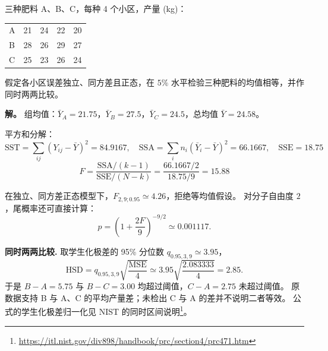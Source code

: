 \begin{exbox}[三种肥料产量比较]
三种肥料 A、B、C，每种 4 个小区，产量 (kg)：

\begin{center}
\begin{tabular}{lcccc}
\hline
A & 21 & 24 & 22 & 20 \\
B & 28 & 26 & 29 & 27 \\
C & 25 & 23 & 26 & 24 \\
\hline
\end{tabular}
\end{center}
假定各小区误差独立、同方差且正态，在 $5\%$ 水平检验三种肥料的均值相等，并作同时两两比较。

\textbf{解。} 组均值：$\bar Y_A=21.75$，$\bar Y_B=27.5$，$\bar Y_C=24.5$，总均值 $\bar Y=24.58$。

平方和分解：
\[
\mathrm{SST}=\sum_{ij}(Y_{ij}-\bar Y)^2=84.9167,\quad
\mathrm{SSA}=\sum_i n_i(\bar Y_i-\bar Y)^2=66.1667,\quad
\mathrm{SSE}=18.75
\]
\[
F=\frac{\mathrm{SSA}/(k-1)}{\mathrm{SSE}/(N-k)}=\frac{66.1667/2}{18.75/9}=15.88
\]

在独立、同方差正态模型下，$F_{2,9;0.95}\simeq4.26$，拒绝等均值假设。
对分子自由度 $2$，尾概率还可直接计算：
\[
 p=\left(1+\frac{2F}{9}\right)^{-9/2}\simeq0.001117.
\]



\textbf{同时两两比较.} 取学生化极差的 95\% 分位数 $q_{0.95,3,9}\simeq3.95$，
\[
 \mathrm{HSD}=q_{0.95,3,9}\sqrt{\frac{\mathrm{MSE}}4}
 \simeq3.95\sqrt{\frac{2.083333}4}=2.85.
\]
于是 $B-A=5.75$ 与 $B-C=3.00$ 均超过阈值，$C-A=2.75$ 未超过阈值。
原数据支持 B 与 A、C 的平均产量差；未检出 C 与 A 的差并不说明二者等效。
公式的学生化极差归一化见 NIST 的同时区间说明\footnote{\url{https://itl.nist.gov/div898/handbook/prc/section4/prc471.htm}}。

\end{exbox}
